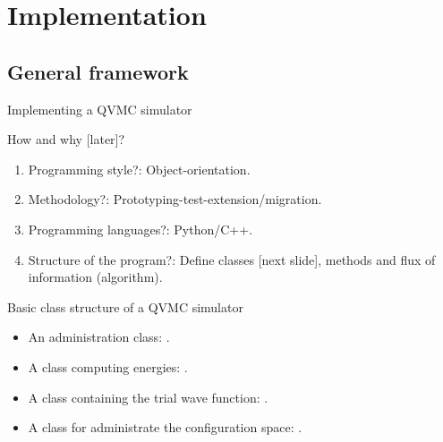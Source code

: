 \section{Implementation}
\subsection{General framework}
\begin{frame}{Implementing a QVMC simulator}
	\begin{scriptsize}
		\begin{alertblock}{How and why [later]?}
			\begin{enumerate}
				\item Programming style?: Object-orientation.
			
				\item Methodology?: Prototyping-test-extension/migration.
				\item Programming languages?: Python/C++.
				
				\item Structure of the program?: Define classes [next slide], methods and flux of information (algorithm).
			\end{enumerate}
		\end{alertblock}
	\end{scriptsize}
	
  \begin{scriptsize}
    \begin{alertblock}{Basic class structure of a QVMC simulator}
      \begin{itemize}
        \item An administration class: {\color{blue}{VMC}}.
        \item A class computing energies: {\color{blue}{Energy}}.
        \item A class containing the trial wave function: {\color{blue}{PsiTrial}}.
        \item A class for administrate the configuration space: {\color{blue}{Particle}}.   
      \end{itemize}
    \end{alertblock}
  \end{scriptsize}
\end{frame}

